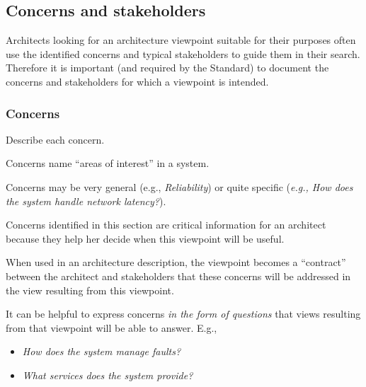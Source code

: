 \subsection{Concerns and stakeholders} 

Architects looking for an architecture viewpoint suitable for their
purposes often use the identified concerns and typical stakeholders to
guide them in their search.  Therefore it is important (and required
by the Standard) to document the concerns and stakeholders for which a
viewpoint is intended.




\subsubsection{Concerns}\label{vp:concerns}


Describe each concern.

Concerns name ``areas of interest'' in a system.


Concerns may be very general (e.g., \textit{Reliability}) or quite
specific (\textit{e.g., How does the system handle network latency?}).
  
Concerns identified in this section are critical information for an
architect because they help her decide when this viewpoint will be
useful.

When used in an architecture description, the viewpoint becomes a
``contract'' between the architect and stakeholders that these
concerns will be addressed in the view resulting from this viewpoint.

It can be helpful to express concerns \emph{in the form of questions}
that views resulting from that viewpoint will be able to answer. E.g.,
\begin{itemize}
\item \textit{How does the system manage faults?}
\item \textit{What services does the system provide?}
\end{itemize}

